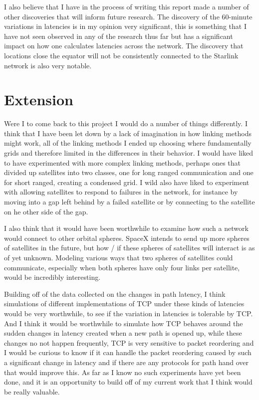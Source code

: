 \documentclass[12pt]{report}
\begin{document}
I also believe that I have in the process of writing this report made a number of other discoveries that will inform future research. The discovery of the 60-minute variations in latencies is in my opinion very significant, this is something that I have not seen observed in any of the research thus far but has a significant impact on how one calculates latencies across the network. The discovery that locations close the equator will not be consistently connected to the Starlink network is also very notable.

\section{Extension}

Were I to come back to this project I would do a number of things differently. I think that I have been let down by a lack of imagination in how linking methods might work, all of the linking methods I ended up choosing where fundamentally grids and therefore limited in the differences in their behavior. I would have liked to have experimented with more complex linking methods, perhaps ones that divided up satellites into two classes, one for long ranged communication and one for short ranged, creating a condensed grid. I wild also have liked to experiment with allowing satellites to respond to failures in the network, for instance by moving into a gap left behind by a failed satellite or by connecting to the satellite on he other side of the gap.

I also think that it would have been worthwhile to examine how such a network would connect to other orbital spheres. SpaceX intends to send up more spheres of satellites in the future, but how / if these spheres of satellites will interact is as of yet unknown. Modeling various ways that two spheres of satellites could communicate, especially when both spheres have only four links per satellite, would be incredibly interesting.

Building off of the data collected on the changes in path latency, I think simulations of different implementations of TCP under these kinds of latencies would be very worthwhile, to see if the variation in latencies is tolerable by TCP. And I think it would be worthwhile to simulate how TCP behaves around the sudden changes in latency created when a new path is opened up, while these changes no not happen frequently, TCP is very sensitive to packet reordering and I would be curious to know if it can handle the packet reordering caused by such a significant change in latency and if there are any protocols for path hand over that would improve this. As far as I know no such experiments have yet been done, and it is an opportunity to build off of my current work that I think would be really valuable.
\end{document}
